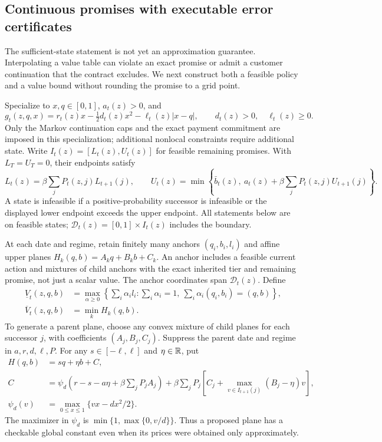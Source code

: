 \subsection{Continuous promises with executable error certificates}\label{sec:continuous}
The sufficient-state statement is not yet an approximation guarantee. Interpolating a value table can violate an exact promise or admit a customer continuation that the contract excludes. We next construct both a feasible policy and a value bound without rounding the promise to a grid point.

Specialize to $x,q\in[0,1]$, $a_t(z)>0$, and
\begin{equation}\label{eq:r26-stage}
 g_t(z,q,x)=r_t(z)x-\tfrac12d_t(z)x^2-\ell_t(z)|x-q|,
 \qquad d_t(z)>0,\quad\ell_t(z)\geq0.
\end{equation}
Only the Markov continuation caps and the exact payment commitment are imposed in this specialization; additional nonlocal constraints require additional state. Write $I_t(z)=[L_t(z),U_t(z)]$ for feasible remaining promises. With $L_T=U_T=0$, their endpoints satisfy
\begin{equation}\label{eq:r26-domain}
 L_t(z)=\beta\sum_jP_t(z,j)L_{t+1}(j),\qquad
 U_t(z)=\min\left\{\bar b_t(z),\ a_t(z)+\beta\sum_jP_t(z,j)U_{t+1}(j)\right\}.
\end{equation}
A state is infeasible if a positive-probability successor is infeasible or the displayed lower endpoint exceeds the upper endpoint. All statements below are on feasible states; $\mathcal D_t(z)=[0,1]\times I_t(z)$ includes the boundary.

At each date and regime, retain finitely many anchors $(q_i,b_i,l_i)$ and affine upper planes $H_k(q,b)=A_kq+B_kb+C_k$. An anchor includes a feasible current action and mixtures of child anchors with the exact inherited tier and remaining promise, not just a scalar value. The anchor coordinates span $\mathcal D_t(z)$. Define
\begin{equation}\label{eq:r26-envelopes}
 \begin{split}
 \underline V_t(z,q,b)&=\max_{\alpha\geq0}\left\{\sum_i\alpha_i l_i:
 \sum_i\alpha_i=1,\ \sum_i\alpha_i(q_i,b_i)=(q,b)\right\},\\
 \overline V_t(z,q,b)&=\min_k H_k(q,b).
 \end{split}
\end{equation}
To generate a parent plane, choose any convex mixture of child planes for each successor $j$, with coefficients $(A_j,B_j,C_j)$. Suppress the parent date and regime in $a,r,d,\ell,P$. For any $s\in[-\ell,\ell]$ and $\eta\in\mathbb R$, put
\begin{equation}\label{eq:r26-plane}
 \begin{split}
 H(q,b)&=s q+\eta b+C,\\
 C&=\psi_d\!\left(r-s-a\eta+\beta\sum_jP_jA_j\right)
 +\beta\sum_jP_j\left[C_j+
 \max_{v\in I_{t+1}(j)}(B_j-\eta)v\right],\\
 \psi_d(v)&=\max_{0\leq x\leq1}\{vx-dx^2/2\}.
 \end{split}
\end{equation}
The maximizer in $\psi_d$ is $\min\{1,\max\{0,v/d\}\}$. Thus a proposed plane has a checkable global constant even when its prices were obtained only approximately.

